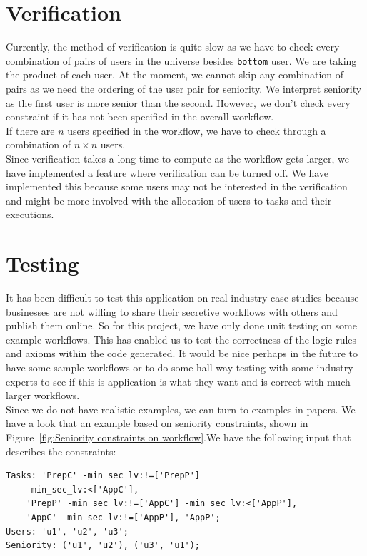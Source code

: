 \documentclass[a4paper]{report}
\begin{document}
\section{Verification}
Currently, the method of verification is quite slow as we have to check every combination of pairs of users in the universe besides \texttt{bottom} user. We are taking the product of each user. At the moment, we cannot skip any combination of pairs as we need the ordering of the user pair for seniority. We interpret seniority as the first user is more senior than the second. However, we don't check every constraint if it has not been specified in the overall workflow.\\

If there are $n$ users specified in the workflow, we have to check through a combination of $n \times n$ users. \\

Since verification takes a long time to compute as the workflow gets larger, we have implemented a feature where verification can be turned off. We have implemented this because some users may not be interested in the verification and might be more involved with the allocation of users to tasks and their executions. \\

\section{Testing}
It has been difficult to test this application on real industry case studies because businesses are not willing to share their secretive workflows with others and publish them online. So for this project, we have only done unit testing on some example workflows. This has enabled us to test the correctness of the logic rules and axioms within the code generated. It would be nice perhaps in the future to have some sample workflows or to do some hall way testing with some industry experts to see if this is application is what they want and is correct with much larger workflows.\\

Since we do not have realistic examples, we can turn to examples in papers. We have a look that an example based on seniority constraints, shown in Figure~\ref{fig:Seniority constraints on workflow}.We have the following input that describes the constraints:
\begin{lstlisting}[frame=single]
Tasks: 'PrepC' -min_sec_lv:!=['PrepP'] 
	-min_sec_lv:<['AppC'], 
	'PrepP' -min_sec_lv:!=['AppC'] -min_sec_lv:<['AppP'], 
	'AppC' -min_sec_lv:!=['AppP'], 'AppP';
Users: 'u1', 'u2', 'u3';
Seniority: ('u1', 'u2'), ('u3', 'u1');
\end{lstlisting}
\end{document}
